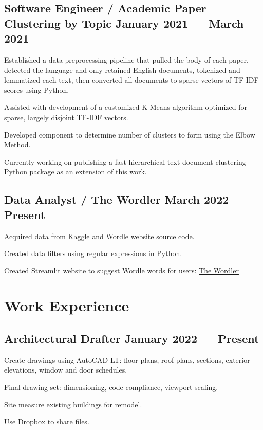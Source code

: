 \documentclass[letter,10pt]{article}
\begin{document}
\subsection{{Software Engineer / Academic Paper Clustering by Topic \hfill January 2021 --- March 2021}}
\begin{zitemize}
    \item Established a data preprocessing pipeline that pulled the body of each paper, detected the language and only retained English documents, tokenized and lemmatized each text, then converted all documents to sparse vectors of TF-IDF scores using Python.
    \item Assisted with development of a customized K-Means algorithm optimized for sparse, largely disjoint TF-IDF vectors.
    \item Developed component to determine number of clusters to form using the Elbow Method.
    \item Currently working on publishing a fast hierarchical text document clustering Python package as an extension of this work.
\end{zitemize}

\subsection{{Data Analyst / The Wordler \hfill March 2022 --- Present}}
\begin{zitemize}
    \item Acquired data from Kaggle and Wordle website source code.
    \item Created data filters using regular expressions in Python.
    \item Created Streamlit website to suggest Wordle words for users: \href{https://share.streamlit.io/middlec000/wordler/main/src/main.py}{The Wordler}
\end{zitemize}

\newpage
\section{Work Experience}
\subsection{{Architectural Drafter \hfill January 2022 --- Present}}
\begin{zitemize}
    \item Create drawings using AutoCAD LT: floor plans, roof plans, sections, exterior elevations, window and door schedules.
    \item Final drawing set: dimensioning, code compliance, viewport scaling.
    \item Site measure existing buildings for remodel.
    \item Use Dropbox to share files.
\end{zitemize}
\end{document}
